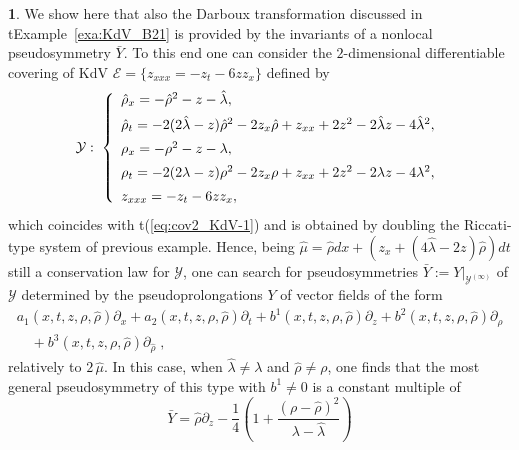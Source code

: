 \documentclass[12pt,english]{elsarticle}
\theoremstyle{plain}
\theoremstyle{plain}
\theoremstyle{remark}
\theoremstyle{plain}
\theoremstyle{definition}
\theoremstyle{definition}
\newtheorem{example}[thm]{\protect\examplename}
\providecommand{\examplename}{Example}
\begin{document}
\begin{example}
\label{exa:DT_KdV}%
We show here that also the Darboux transformation discussed in t{Example~\ref{exa:KdV_B21}} is provided by the invariants of a nonlocal pseudosymmetry
$\bar{Y}$. To this end one can consider the $2$-dimensional differentiable
covering of KdV $\mathcal{E}=\{z_{xxx}=-z_{t}-6zz_{x}\}$ defined by
%
\begin{equation*}
\mathcal{Y}:\;\left \{
%
\begin{array}{l}
\hat{\rho}_{x}=-\hat{\rho}^{2}-z-\hat{\lambda},
\vspace{5pt}
\\
\hat{\rho}_{t}=-2(2\hat{\lambda}-z)\hat{\rho}^{2}-2z_{x}\hat{\rho}+z_{xx}+2z^{2}-2
\hat{\lambda}z-4\hat{\lambda}^{2},
\vspace{5pt}
\\
\rho _{x}=-\rho ^{2}-z-\lambda ,
\vspace{5pt}
\\
\rho _{t}=-2(2\lambda -z)\rho ^{2}-2z_{x}\rho +z_{xx}+2z^{2}-2
\lambda z-4\lambda ^{2},
\vspace{5pt}
\\
z_{xxx}=-z_{t}-6zz_{x},
\end{array}
%
\right .
\end{equation*}
%
which coincides with t{(\ref{eq:cov2_KdV-1})} and is obtained by doubling
the Riccati-type system of previous example. Hence, being
$\hat{\mu} =\hat{\rho} dx+\left (z_{x}+\left (4\hat{\lambda} -2z\right )\hat{\rho} \right )dt$
still a conservation law for $\mathcal{Y}$, one can search for pseudosymmetries
$\bar{Y}:=\left .Y\right |_{\mathcal{Y}^{(\infty )}}$ of
$\mathcal{Y}$ determined by the pseudoprolongations $Y$ of vector fields
of the form
%
\begin{eqnarray*}[ll]
a_{1}(x,t,z,\rho ,\hat{\rho})\partial _{x}+a_{2}(x,t,z,\rho ,
\hat{\rho})\partial _{t}+b^{1}(x,t,z,\rho ,\hat{\rho})\partial _{z}+b^{2}(x,t,z,
\rho ,\hat{\rho})\partial _{\rho}\\
\quad { }+b^{3}(x,t,z,\rho ,\hat{\rho})
\partial _{\hat{\rho}}\;,
\end{eqnarray*}
%
relatively to $2\,\hat{\mu} $. In this case, when
$\hat{\lambda}\neq \lambda $ and $\hat{\rho}\neq \rho $, one finds that
the most general pseudosymmetry of this type with $b^{1}\neq 0$ is a constant
multiple of
%
\begin{equation*}
\bar{Y}=\hat{\rho}\partial _{z}-\frac{1}{4}\left (1+
\frac{(\rho -\hat{\rho})^{2}}{\lambda -\hat{\lambda}}\right )

\end{equation*}
\end{example}
\end{document}
